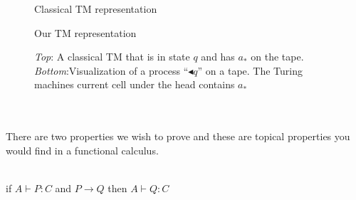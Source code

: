 \documentclass{article}
\begin{document}
	\begin{figure}
		\centering
		{\footnotesize Classical TM representation}
		
		\vspace{3em}
		
		
		{\footnotesize Our TM representation}
		\caption{\textit{Top}: A classical TM that is in state \(q\) and has \(a_*\) on the tape. \textit{Bottom}:Visualization of a process ``$\blacktriangleleft q$'' on a tape. The Turing machines current cell under the head contains \(a_*\)}
	\end{figure}
\\
\\
There are two properties we wish to prove and these are topical properties you would find in a functional calculus.
\\\\
\begin{theorem}[Preservation]
if \(A \vdash P : C\) and \(P \rightarrow Q\) then \( A \vdash Q:C \)
\end{theorem}
\end{document}
